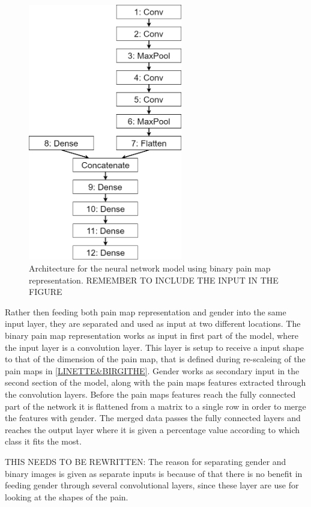 \begin{figure} [H]
\centering
\includegraphics[width=0.6\textwidth]{figures/binaryRepModel}
\caption{Architecture for the neural network model using binary pain map representation. REMEMBER TO INCLUDE THE INPUT IN THE FIGURE}
\label{fig:binaryRepModel}  
\end{figure}

Rather then feeding both pain map representation and gender into the same input layer, they are separated and used as input at two different locations. 
The binary pain map representation works as input in first part of the model, where the input layer is a convolution layer. 
This layer is setup to receive a input shape to that of the dimension of the pain map, that is defined during re-scaleing of the pain maps in \ref{LINETTE&BIRGITHE}. 
Gender works as secondary input in the second section of the model, along with the pain maps features extracted through the convolution layers. Before the pain maps features reach the fully connected part of the network it is flattened from a matrix to a single row in order to merge the features with gender. 
The merged data passes the fully connected layers and reaches the output layer where it is given a percentage value according to which class it fits the most. 


THIS NEEDS TO BE REWRITTEN: The reason for separating gender and binary images is given as separate inputs is because of that there is no benefit in feeding gender through several convolutional layers, since these layer are use for looking at the shapes of the pain.  

